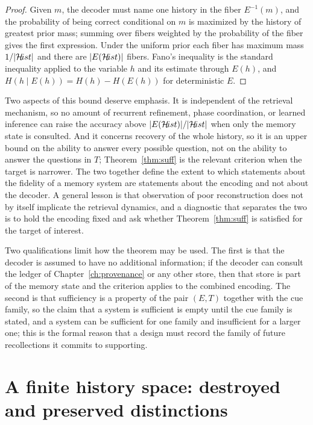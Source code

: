 \begin{proof}
Given $m$, the decoder must name one history in the fiber $E^{-1}(m)$, and the probability of being correct conditional on $m$ is maximized by the history of greatest prior mass; summing over fibers weighted by the probability of the fiber gives the first expression. Under the uniform prior each fiber has maximum mass $1/|\mathcal{H}\!ist|$ and there are $|E(\mathcal{H}\!ist)|$ fibers. Fano's inequality is the standard inequality \cite{cover2006} applied to the variable $h$ and its estimate through $E(h)$, and $H(h\mid E(h))=H(h)-H(E(h))$ for deterministic $E$.
\end{proof}

Two aspects of this bound deserve emphasis. It is independent of the retrieval mechanism, so no amount of recurrent refinement, phase coordination, or learned inference can raise the accuracy above $|E(\mathcal{H}\!ist)|/|\mathcal{H}\!ist|$ when only the memory state is consulted. And it concerns recovery of the whole history, so it is an upper bound on the ability to answer every possible question, not on the ability to answer the questions in $T$; Theorem~\ref{thm:suff} is the relevant criterion when the target is narrower. The two together define the extent to which statements about the fidelity of a memory system are statements about the encoding and not about the decoder. A general lesson is that observation of poor reconstruction does not by itself implicate the retrieval dynamics, and a diagnostic that separates the two is to hold the encoding fixed and ask whether Theorem~\ref{thm:suff} is satisfied for the target of interest.

Two qualifications limit how the theorem may be used. The first is that the decoder is assumed to have no additional information; if the decoder can consult the ledger of Chapter~\ref{ch:provenance} or any other store, then that store is part of the memory state and the criterion applies to the combined encoding. The second is that sufficiency is a property of the pair $(E,T)$ together with the cue family, so the claim that a system is sufficient is empty until the cue family is stated, and a system can be sufficient for one family and insufficient for a larger one; this is the formal reason that a design must record the family of future recollections it commits to supporting.

\section*{A finite history space: destroyed and preserved distinctions}\label{sec:finite32}

